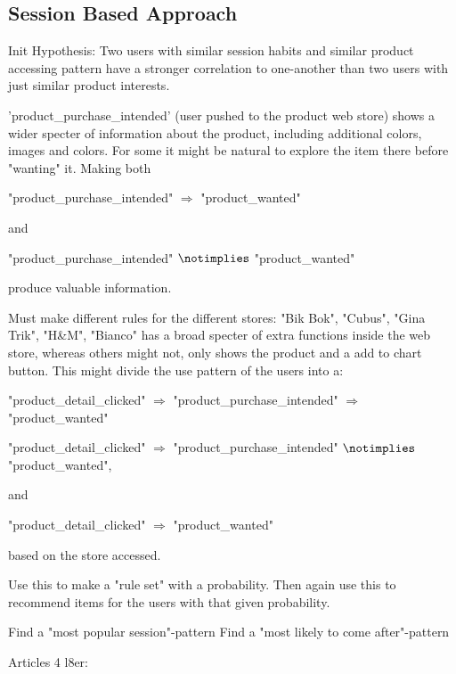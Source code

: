 \subsection{Session Based Approach}
Init Hypothesis:
Two users with similar session habits and similar product accessing pattern
have a stronger correlation to one-another than two users with just similar
product interests.


'product\_purchase\_intended' (user pushed to the product web store) shows a
wider specter of information about the product, including additional colors,
images and colors.  For some it might be natural to explore the item there
before "wanting" it. Making both

"product\_purchase\_intended" $\Rightarrow$ "product\_wanted"

and

"product\_purchase\_intended" $\notimplies$ "product\_wanted"

produce valuable information.

Must make different rules for the different stores:
"Bik Bok", "Cubus", "Gina Trik", "H\&M", "Bianco" has a broad specter of extra
functions inside the web store, whereas others might not, only shows the
product and a add to chart button.  This might divide the use pattern of the
users into a:

"product\_detail\_clicked" $\Rightarrow$ "product\_purchase\_intended" $\Rightarrow$ "product\_wanted"

"product\_detail\_clicked" $\Rightarrow$ "product\_purchase\_intended" $\notimplies$ "product\_wanted",

and

"product\_detail\_clicked" $\Rightarrow$ "product\_wanted"

based on the store accessed.

Use this to make a "rule set" with a probability.
Then again use this to recommend items for the users with that given
probability.

Find a "most popular session"-pattern
Find a "most likely to come after"-pattern


Articles 4 l8er:

